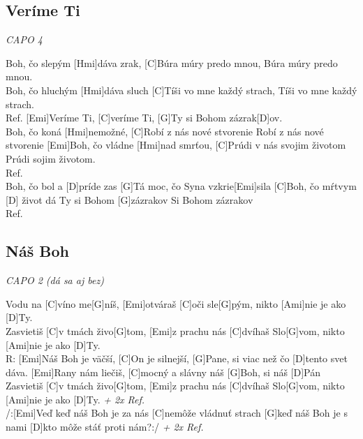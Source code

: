 \documentclass[10pt]{article}
\begin{document}
\begin{Large}
\begin{minipage}{\textwidth}
\subsection{Veríme Ti}
\textit{CAPO 4}
\begin{multicols}{2}
\begin{guitar}
	[Emi]Boh, čo slepým [Hmi]dáva zrak,
	[C]Búra múry predo mnou,
	Búra múry predo mnou.
	\\
	[Emi]Boh, čo hluchým [Hmi]dáva sluch
	[C]Tíši vo mne každý strach,
	Tíši vo mne každý strach.
	\\
	Ref. [Emi]Veríme Ti, [C]veríme Ti,
	[G]Ty si Bohom zázrak[D]ov.
	\\
	[Emi]Boh, čo koná [Hmi]nemožné,
	[C]Robí z nás nové stvorenie
	Robí z nás nové stvorenie
	[Emi]Boh, čo vládne [Hmi]nad smrťou,
	[C]Prúdi v nás svojim životom
	Prúdi sojim životom.
	\\
	Ref.
	\\
	[G]Boh, čo bol a [D]príde zas
	[G]Tá moc, čo Syna vzkrie[Emi]sila
	[C]Boh, čo mŕtvym [D] život dá
	Ty si Bohom [G]zázrakov
	Si Bohom zázrakov
	\\
	Ref.
\end{guitar}
\end{multicols}
\end{minipage}

\begin{minipage}{\textwidth}
\subsection{Náš Boh}
\textit{CAPO 2 (dá sa aj bez)}
\begin{multicols}{2}
\begin{guitar}
	[Emi]Vodu na [C]víno me[G]níš,
	[Emi]otváraš [C]oči sle[G]pým,
	nikto [Ami]nie je ako [D]Ty.
	\\
	[Emi]Zasvietiš [C]v tmách živo[G]tom,
	[Emi]z prachu nás [C]dvíhaš Slo[G]vom,
	nikto [Ami]nie je ako [D]Ty.
	\\
	R: [Emi]Náš Boh je väčší, [C]On je silnejší,
	[G]Pane, si viac než čo [D]tento svet dáva.
	[Emi]Rany nám liečiš, [C]mocný a slávny
	náš [G]Boh, si náš [D]Pán
	\columnbreak
	[Emi]Zasvietiš [C]v tmách živo[G]tom,
	[Emi]z prachu nás [C]dvíhaš Slo[G]vom,
	nikto [Ami]nie je ako [D]Ty. \textit{+ 2x Ref.}
	\\
	/:[Emi]Veď keď náš Boh je za nás
	[C]nemôže vládnuť strach
	[G]keď náš Boh je s nami
	[D]kto môže stáť proti nám?:/ \textit{+ 2x Ref.}
\end{guitar}
\end{multicols}
\end{minipage}


\end{Large}
\end{document}
